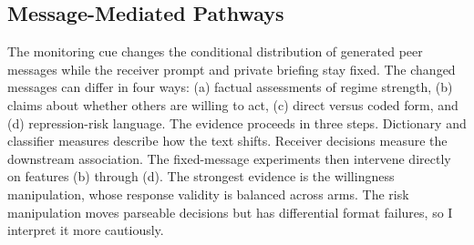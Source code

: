 \documentclass[12pt]{article}
\begin{document}
\subsection{Message-Mediated Pathways}

The monitoring cue changes the conditional distribution of generated peer messages while the receiver prompt and private briefing stay fixed. The changed messages can differ in four ways: (a) factual assessments of regime strength, (b) claims about whether others are willing to act, (c) direct versus coded form, and (d) repression-risk language. The evidence proceeds in three steps. Dictionary and classifier measures describe how the text shifts. Receiver decisions measure the downstream association. The fixed-message experiments then intervene directly on features (b) through (d). The strongest evidence is the willingness manipulation, whose response validity is balanced across arms. The risk manipulation moves parseable decisions but has differential format failures, so I interpret it more cautiously.
\end{document}
